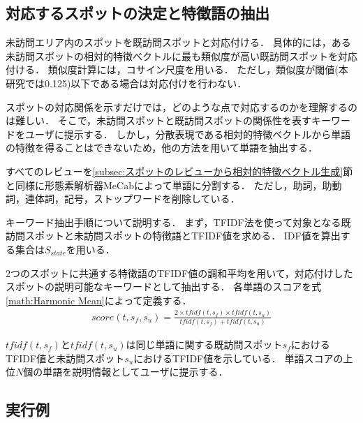 \documentclass[submit]{ipsj}
\begin{document}
\subsection{対応するスポットの決定と特徴語の抽出}
\label{subsec:対応するスポットの決定と特徴語の抽出}
未訪問エリア内のスポットを既訪問スポットと対応付ける．
具体的には，ある未訪問スポットの相対的特徴ベクトルに最も類似度が高い既訪問スポットを対応付ける．
類似度計算には，コサイン尺度を用いる．
ただし，類似度が閾値(本研究では0.125)以下である場合は対応付けを行わない．

スポットの対応関係を示すだけでは，どのような点で対応するのかを理解するのは難しい．
そこで，未訪問スポットと既訪問スポットの関係性を表すキーワードをユーザに提示する．
しかし，分散表現である相対的特徴ベクトルから単語の特徴を得ることはできないため，他の方法を用いて単語を抽出する．

すべてのレビューを\ref{subsec:スポットのレビューから相対的特徴ベクトル生成}節と同様に形態素解析器MeCabによって単語に分割する．
ただし，助詞，助動詞，連体詞，記号，ストップワードを削除している．

キーワード抽出手順について説明する．
まず，TFIDF法を使って対象となる既訪問スポットと未訪問スポットの特徴語とTFIDF値を求める．
IDF値を算出する集合は$S_{state}$を用いる．

2つのスポットに共通する特徴語のTFIDF値の調和平均を用いて，対応付けしたスポットの説明可能なキーワードとして抽出する．
各単語のスコアを式\ref{math:Harmonic Mean}によって定義する．
\begin{eqnarray}
  score(t,s_f,s_u) = \frac{2 \times tfidf(t,s_f) \times tfidf(t,s_u)}{tfidf(t,s_f) + tfidf(t,s_u)}
  \label{math:Harmonic Mean}
\end{eqnarray}

$tfidf(t,s_f)$と$tfidf(t,s_u)$は同じ単語に関する既訪問スポット$s_f$におけるTFIDF値と未訪問スポット$s_u$におけるTFIDF値を示している．
単語スコアの上位$N$個の単語を説明情報としてユーザに提示する．

\subsection{実行例}
\label{subsec:実行例}
\end{document}
